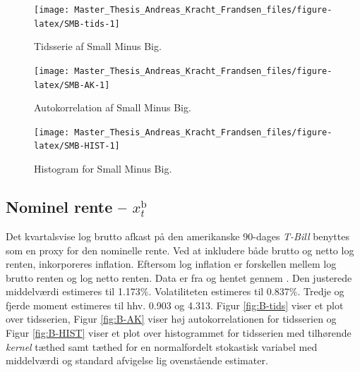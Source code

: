 \documentclass[
  a4paper,
  oneside]{memoir}
\begin{document}
\begin{figure}[H]

{\centering \texttt{[image: Master\_Thesis\_Andreas\_Kracht\_Frandsen\_files/figure-latex/SMB-tids-1]} 

}

\caption{Tidsserie af Small Minus Big.}\label{fig:SMB-tids}
\end{figure}

\begin{figure}[H]

{\centering \texttt{[image: Master\_Thesis\_Andreas\_Kracht\_Frandsen\_files/figure-latex/SMB-AK-1]} 

}

\caption{Autokorrelation af Small Minus Big.}\label{fig:SMB-AK}
\end{figure}

\begin{figure}[H]

{\centering \texttt{[image: Master\_Thesis\_Andreas\_Kracht\_Frandsen\_files/figure-latex/SMB-HIST-1]} 

}

\caption{Histogram for Small Minus Big.}\label{fig:SMB-HIST}
\end{figure}

\hypertarget{nominel-rente-x_ttextb}{%
\subsection{\texorpdfstring{Nominel rente -- \(x_t^{\text{b}}\)}{Nominel rente -- x\_t\^{}\{\textbackslash text\{b\}\}}}\label{nominel-rente-x_ttextb}}

Det kvartalsvise log brutto afkast på den amerikanske 90-dages \emph{T-Bill} benyttes som en proxy for den nominelle rente. Ved at inkludere både brutto og netto log renten, inkorporeres inflation. Eftersom log inflation er forskellen mellem log brutto renten og log netto renten. Data er fra \citep{CRSPt90} og hentet gennem \citep{WRDSt90}. Den justerede middelværdi estimeres til 1.173\(\%\). Volatiliteten estimeres til 0.837\(\%\). Tredje og fjerde moment estimeres til hhv. 0.903 og 4.313. Figur \ref{fig:B-tids} viser et plot over tidsserien, Figur \ref{fig:B-AK} viser høj autokorrelationen for tidsserien og Figur \ref{fig:B-HIST} viser et plot over histogrammet for tidsserien med tilhørende \emph{kernel} tæthed samt tæthed for en normalfordelt stokastisk variabel med middelværdi og standard afvigelse lig ovenstående estimater.
\end{document}

